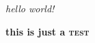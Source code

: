 \documentclass[ngerman]{letter}
\begin{document}
\textit{hello world!}



\textbf{this is just a \textsc{test}}
\end{document}
